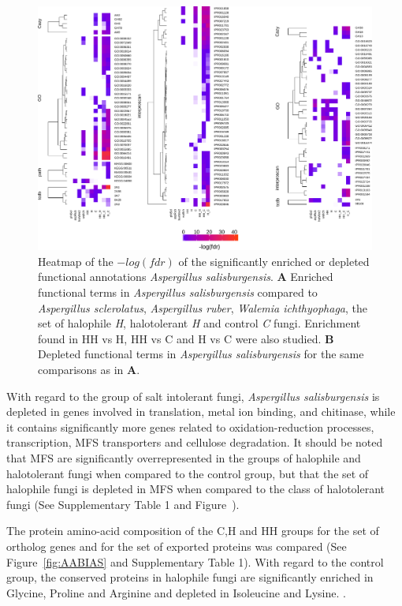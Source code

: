 \documentclass[jof,article,submit,moreauthors,pdftex,10pt,a4paper]{Definitions/mdpi}
\newcommand{\TODO}[1]{\textbf{\color{red}{#1}}}
\newcommand{\aspRub}{\textit{Aspergillus ruber}}
\newcommand{\walIch}{\textit{Walemia ichthyophaga}}
\newcommand{\phiSp}{\textit{Aspergillus salisburgensis}}
\newcommand{\phiScl}{\textit{Aspergillus sclerolatus}}
\begin{document}
\begin{figure}[htbp]
    \centering
    \includegraphics[width=0.9\linewidth]{over_under.pdf}
    \caption{\label{fig:ovun} Heatmap of the $-log(fdr)$ of the significantly enriched or depleted functional annotations {\phiSp}. 
    \textbf{A} Enriched functional terms in {\phiSp} compared to {\phiScl}, {\aspRub}, {\walIch}, the set of halophile \textit{H}, halotolerant \textit{H} and control \textit{C} fungi. Enrichment found in HH vs H, HH vs C and H vs C were also studied. \textbf{B} Depleted functional terms in {\phiSp} for the same comparisons as in \textbf{A}.}
\end{figure}

With regard to the group of salt intolerant fungi, \phiSp{} is depleted in genes involved in translation, metal ion binding, and chitinase, while it contains significantly more genes related to oxidation-reduction processes, transcription, MFS transporters and cellulose degradation. It should be noted that MFS are significantly overrepresented in the groups of halophile and halotolerant fungi when compared to the control group, but that the set of halophile fungi is depleted in MFS when compared to the class of halotolerant fungi (See Supplementary Table 1 and Figure~\cite{fig:ovun}).




The protein amino-acid composition of the C,H and HH groups for the set of ortholog genes and for the set of exported proteins was compared 
(See Figure~\ref{fig:AABIAS} and Supplementary Table 1). With regard to the control group, the conserved proteins in halophile fungi are significantly enriched in Glycine, Proline and Arginine and depleted in Isoleucine and Lysine. \TODO{Redo analysis on secreted protein}.  
\end{document}
